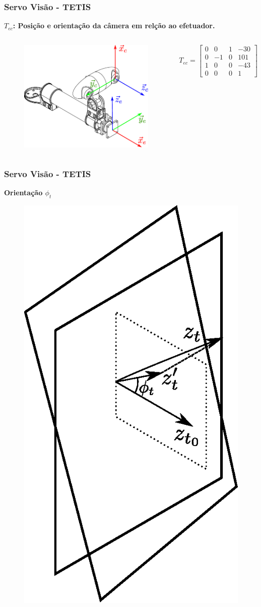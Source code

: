 \documentclass{beamer}
\newcommand\m[1]{\begin{bmatrix}#1\end{bmatrix}}
\begin{document}
\begin{frame}
\frametitle{Servo Visão - TETIS}
\textbf{$T_{ec}$: Posição e orientação da câmera em relção ao efetuador.}
\begin{columns}[c]
\begin{figure}
\includegraphics[width=\linewidth]{./img/effector_camera.eps}
\end{figure}

\begin{equation} \label{eq:tec}
{T}_{ec} = \m{
	0 & 0 & 1 & -30 \\
	0 & -1 & 0 & 101 \\
	1 &  0 & 0 & -43 \\
	0 &  0 & 0 &  1
}
\end{equation}
\end{columns}
\end{frame}

\begin{frame}
\frametitle{Servo Visão - TETIS}
\textbf{Orientação $\phi_t$}
\begin{figure}[!ht]
\centering
  \includegraphics[width=0.3\linewidth]{./img/projection2.eps}
  \label{fig:projection}
\end{figure}%
\end{frame}
\end{document}
